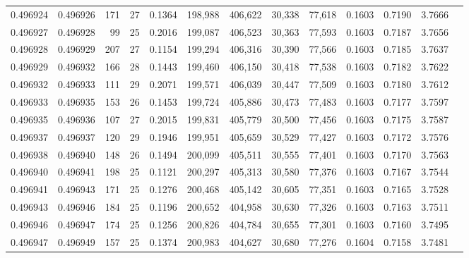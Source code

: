 \begin{tabular}{rrrrrrrrrrrrr}
0.496924 & 0.496926 & 171 &  27 &                                     0.1364 & 198,988 & 406,622 &  30,338 &  77,618 & 0.1603 & 0.7190 & 3.7666 \\
0.496927 & 0.496928 &  99 &  25 &                                     0.2016 & 199,087 & 406,523 &  30,363 &  77,593 & 0.1603 & 0.7187 & 3.7656 \\
0.496928 & 0.496929 & 207 &  27 &                                     0.1154 & 199,294 & 406,316 &  30,390 &  77,566 & 0.1603 & 0.7185 & 3.7637 \\
0.496929 & 0.496932 & 166 &  28 &                                     0.1443 & 199,460 & 406,150 &  30,418 &  77,538 & 0.1603 & 0.7182 & 3.7622 \\
0.496932 & 0.496933 & 111 &  29 &                                     0.2071 & 199,571 & 406,039 &  30,447 &  77,509 & 0.1603 & 0.7180 & 3.7612 \\
0.496933 & 0.496935 & 153 &  26 &                                     0.1453 & 199,724 & 405,886 &  30,473 &  77,483 & 0.1603 & 0.7177 & 3.7597 \\
0.496935 & 0.496936 & 107 &  27 &                                     0.2015 & 199,831 & 405,779 &  30,500 &  77,456 & 0.1603 & 0.7175 & 3.7587 \\
0.496937 & 0.496937 & 120 &  29 &                                     0.1946 & 199,951 & 405,659 &  30,529 &  77,427 & 0.1603 & 0.7172 & 3.7576 \\
0.496938 & 0.496940 & 148 &  26 &                                     0.1494 & 200,099 & 405,511 &  30,555 &  77,401 & 0.1603 & 0.7170 & 3.7563 \\
0.496940 & 0.496941 & 198 &  25 &                                     0.1121 & 200,297 & 405,313 &  30,580 &  77,376 & 0.1603 & 0.7167 & 3.7544 \\
0.496941 & 0.496943 & 171 &  25 &                                     0.1276 & 200,468 & 405,142 &  30,605 &  77,351 & 0.1603 & 0.7165 & 3.7528 \\
0.496943 & 0.496946 & 184 &  25 &                                     0.1196 & 200,652 & 404,958 &  30,630 &  77,326 & 0.1603 & 0.7163 & 3.7511 \\
0.496946 & 0.496947 & 174 &  25 &                                     0.1256 & 200,826 & 404,784 &  30,655 &  77,301 & 0.1603 & 0.7160 & 3.7495 \\
0.496947 & 0.496949 & 157 &  25 &                                     0.1374 & 200,983 & 404,627 &  30,680 &  77,276 & 0.1604 & 0.7158 & 3.7481 \\

\end{tabular}
